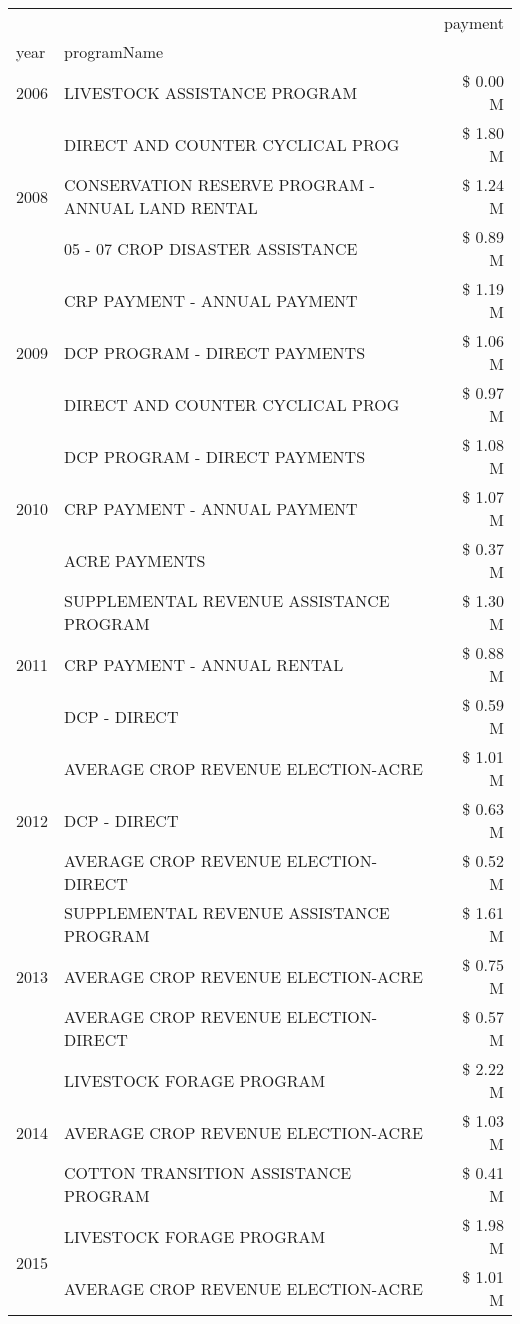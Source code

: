 \begin{tabular}{llr}
\toprule
 &  & payment \\
year & programName &  \\
\midrule
2006 & LIVESTOCK ASSISTANCE PROGRAM & \$ 0.00 M \\
\cline{1-3}
\multirow[t]{3}{*}{2008} & DIRECT AND COUNTER CYCLICAL PROG & \$ 1.80 M \\
 & CONSERVATION RESERVE PROGRAM - ANNUAL LAND RENTAL & \$ 1.24 M \\
 & 05 - 07 CROP DISASTER ASSISTANCE & \$ 0.89 M \\
\cline{1-3}
\multirow[t]{3}{*}{2009} & CRP PAYMENT - ANNUAL PAYMENT & \$ 1.19 M \\
 & DCP PROGRAM - DIRECT PAYMENTS & \$ 1.06 M \\
 & DIRECT AND COUNTER CYCLICAL PROG & \$ 0.97 M \\
\cline{1-3}
\multirow[t]{3}{*}{2010} & DCP PROGRAM - DIRECT PAYMENTS & \$ 1.08 M \\
 & CRP PAYMENT - ANNUAL PAYMENT & \$ 1.07 M \\
 & ACRE PAYMENTS & \$ 0.37 M \\
\cline{1-3}
\multirow[t]{3}{*}{2011} & SUPPLEMENTAL REVENUE ASSISTANCE PROGRAM & \$ 1.30 M \\
 & CRP PAYMENT - ANNUAL RENTAL & \$ 0.88 M \\
 & DCP - DIRECT & \$ 0.59 M \\
\cline{1-3}
\multirow[t]{3}{*}{2012} & AVERAGE CROP REVENUE ELECTION-ACRE & \$ 1.01 M \\
 & DCP - DIRECT & \$ 0.63 M \\
 & AVERAGE CROP REVENUE ELECTION-DIRECT & \$ 0.52 M \\
\cline{1-3}
\multirow[t]{3}{*}{2013} & SUPPLEMENTAL REVENUE ASSISTANCE PROGRAM & \$ 1.61 M \\
 & AVERAGE CROP REVENUE ELECTION-ACRE & \$ 0.75 M \\
 & AVERAGE CROP REVENUE ELECTION-DIRECT & \$ 0.57 M \\
\cline{1-3}
\multirow[t]{3}{*}{2014} & LIVESTOCK FORAGE PROGRAM & \$ 2.22 M \\
 & AVERAGE CROP REVENUE ELECTION-ACRE & \$ 1.03 M \\
 & COTTON TRANSITION ASSISTANCE PROGRAM & \$ 0.41 M \\
\cline{1-3}
\multirow[t]{3}{*}{2015} & LIVESTOCK FORAGE PROGRAM & \$ 1.98 M \\
 & AVERAGE CROP REVENUE ELECTION-ACRE & \$ 1.01 M \\

\end{tabular}
